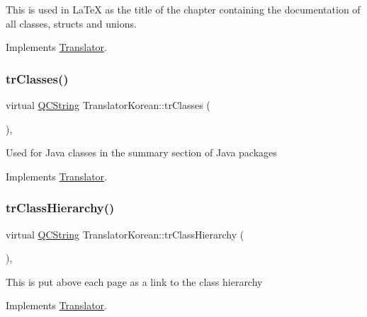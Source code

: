 This is used in La\+TeX as the title of the chapter containing the documentation of all classes, structs and unions. 

Implements \mbox{\hyperlink{class_translator}{Translator}}.

\mbox{\label{class_translator_korean_ae442abef028e4615393d07dfb39f15b3}} 
\subsubsection{\texorpdfstring{trClasses()}{trClasses()}}
{\footnotesize\ttfamily virtual \mbox{\hyperlink{class_q_c_string}{Q\+C\+String}} Translator\+Korean\+::tr\+Classes (\begin{DoxyParamCaption}{ }\end{DoxyParamCaption})\hspace{0.3cm}{\ttfamily [inline]}, {\ttfamily [virtual]}}

Used for Java classes in the summary section of Java packages 

Implements \mbox{\hyperlink{class_translator}{Translator}}.

\mbox{\label{class_translator_korean_a539a3afdba8a5d1cd2e7767c80fb3530}} 
\subsubsection{\texorpdfstring{trClassHierarchy()}{trClassHierarchy()}}
{\footnotesize\ttfamily virtual \mbox{\hyperlink{class_q_c_string}{Q\+C\+String}} Translator\+Korean\+::tr\+Class\+Hierarchy (\begin{DoxyParamCaption}{ }\end{DoxyParamCaption})\hspace{0.3cm}{\ttfamily [inline]}, {\ttfamily [virtual]}}

This is put above each page as a link to the class hierarchy 

Implements \mbox{\hyperlink{class_translator}{Translator}}.

\mbox{\label{class_translator_korean_a5931a79b5388fe14f2dcd26c7a62884c}} 
